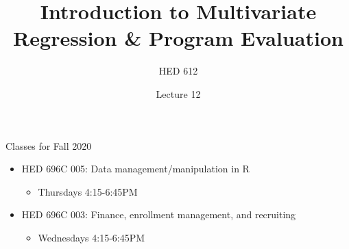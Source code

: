 \documentclass[
  8pt,
  ignorenonframetext,
  dvipsnames]{beamer}
\title{Introduction to Multivariate Regression \& Program Evaluation}
\subtitle{HED 612}
\author{Lecture 12}
\date{}
\providecommand{\tightlist}{%
  \setlength{\itemsep}{0pt}\setlength{\parskip}{0pt}}
\let\olditem\item
\renewcommand{\item}{%
  \olditem\vspace{4pt}
}
\begin{document}
\frame{\titlepage}

\begin{frame}
  \tableofcontents[hideallsubsections]
\end{frame}
\begin{frame}{Classes for Fall 2020}
\protect\hypertarget{classes-for-fall-2020}{}

\begin{itemize}
\tightlist
\item
  HED 696C 005: Data management/manipulation in R

  \begin{itemize}
  \tightlist
  \item
    Thursdays 4:15-6:45PM
  \end{itemize}
\item
  HED 696C 003: Finance, enrollment management, and recruiting

  \begin{itemize}
  \tightlist
  \item
    Wednesdays 4:15-6:45PM
  \end{itemize}
\end{itemize}

\end{frame}
\end{document}
